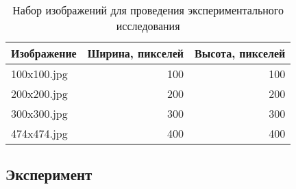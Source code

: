 \begin{table}[ht]
\begin{center}
\begin{tabular}{l|r|r|}
\hline
Изображение & Ширина, пикселей & Высота, пикселей \\
\hline
\hline
100x100.jpg                        &      100          &      100  \\
200x200.jpg                        &      200          &      200   \\
300x300.jpg                         &      300          &      300    \\
474x474.jpg                         &      400          &      400    \\
\hline
\end{tabular}
\end{center}
\caption{Набор изображений для проведения экспериментального исследования}
\label{images}
\end{table}



\subsection{Эксперимент}



